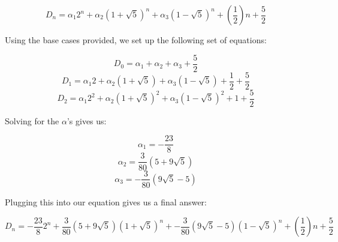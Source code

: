 \begin{solution}
\[ D_{n} = \alpha_{1}2^{n} +  \alpha_{2}(1 + \sqrt{5})^{n} + \alpha_{3}(1 - \sqrt{5})^{n} + (\frac{1}{2})n + \frac{5}{2} \]

Using the base cases provided, we set up the following set of equations:

\[ D_{0} = \alpha_{1} + \alpha_{2} + \alpha_{3} + \frac{5}{2} \]
\[ D_{1} = \alpha_{1}2 + \alpha_{2}(1 + \sqrt{5}) + \alpha_{3}(1 - \sqrt{5})  + \frac{1}{2} +  \frac{5}{2} \]
\[ D_{2} = \alpha_{1}2^{2} + \alpha_{2}(1 + \sqrt{5})^{2} + \alpha_{3}(1 - \sqrt{5})^{2}  + 1 +  \frac{5}{2} \]

Solving for the $\alpha$'s gives us:

\[ \alpha_{1} = -\frac{23}{8} \]
\[ \alpha_{2} = \frac{3}{80}(5 + 9\sqrt{5}) \]
\[ \alpha_{3} = -\frac{3}{80}(9\sqrt{5} - 5) \]

Plugging this into our equation gives us a final answer:

\[ D_{n} =  -\frac{23}{8}2^{n} +  \frac{3}{80}(5 + 9\sqrt{5})(1 + \sqrt{5})^{n} +  -\frac{3}{80}(9\sqrt{5} - 5) (1 - \sqrt{5})^{n} + (\frac{1}{2})n + \frac{5}{2} \]

\end{solution}


